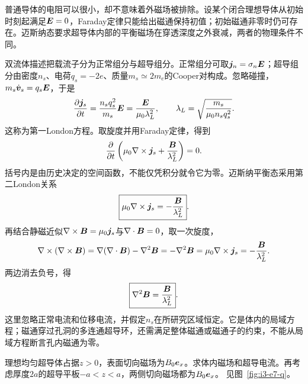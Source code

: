 普通导体的电阻可以很小，却不意味着外磁场被排除。设某个闭合理想导体从初始时刻起满足$\bm{E}=0$，Faraday定律只能给出磁通保持初值；初始磁通非零时仍可存在。迈斯纳态要求超导体内部的平衡磁场在穿透深度之外衰减，两者的物理条件不同。

双流体描述把载流子分为正常组分与超导组分。正常组分可取$\bm{j}_n=\sigma_n\bm{E}$；超导组分由密度$n_s$、电荷$q_s=-2e$、质量$m_s\simeq2m_e$的Cooper对构成。忽略碰撞，$m_s\dot{\bm{v}}_s=q_s\bm{E}$，于是
\[
\frac{\partial\bm{j}_s}{\partial t}
=\frac{n_sq_s^2}{m_s}\bm{E}
=\frac{\bm{E}}{\mu_0\lambda_L^2},\qquad
\lambda_L=\sqrt{\frac{m_s}{\mu_0n_sq_s^2}}.
\]
这称为第一London方程。取旋度并用Faraday定律，得到
\[
\frac{\partial}{\partial t}
\left(\mu_0\nabla\times\bm{j}_s+\frac{\bm{B}}{\lambda_L^2}\right)=0.
\]
括号内是由历史决定的空间函数，不能仅凭积分就令它为零。迈斯纳平衡态采用第二London关系
\[
\boxed{\mu_0\nabla\times\bm{j}_s=-\frac{\bm{B}}{\lambda_L^2}}.
\]
再结合静磁近似$\nabla\times\bm{B}=\mu_0\bm{j}_s$与$\nabla\cdot\bm{B}=0$，取一次旋度，
\[\nabla\times(\nabla\times\bm{B})
=\nabla(\nabla\cdot\bm{B})-\nabla^2\bm{B}
=-\nabla^2\bm{B}
=\mu_0\nabla\times\bm{j}_s=-\frac{\bm{B}}{\lambda_L^2}.\]
两边消去负号，得
\[
\boxed{\nabla^2\bm{B}=\frac{\bm{B}}{\lambda_L^2}}.
\]
这里忽略正常电流和位移电流，并假定$n_s$在所研究区域恒定。它是体内的局域方程；磁通穿过孔洞的多连通超导环，还需满足整体磁通或磁通子的约束，不能从局域方程断言孔内磁通为零。


\begin{example}[半空间与薄超导平板的穿透场]\label{ex:i3-e7}

理想均匀超导体占据$z>0$，表面切向磁场为$B_0\bm{e}_x$。求体内磁场和超导电流。再考虑厚度$2a$的超导平板$-a<z<a$，两侧切向磁场都为$B_0\bm{e}_x$。
 见图~\ref{fig:i3-e7-q}。
\end{example}

